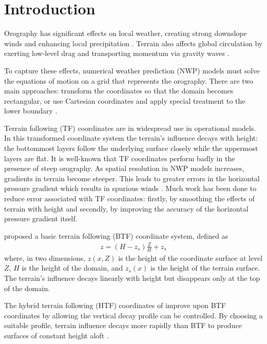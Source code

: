 \chapter{Introduction}

Orography has significant effects on local weather, creating strong downslope winds and enhancing local precipitation \autocite{barry2008}.  Terrain also affects global circulation by exerting low-level drag \autocite{lott-miller1997} and transporting momentum via gravity waves \autocite{mcfarlane1987}.

To capture these effects, numerical weather prediction (NWP) models must solve the equations of motion on a grid that represents the orography.  There are two main approaches: transform the coordinates so that the domain becomes rectangular, or use Cartesian coordinates and apply special treatment to the lower boundary \autocite{galchen-somerville1975}.

Terrain following (TF) coordinates are in widespread use in operational models.  In this transformed coordinate system the terrain's influence decays with height: the bottommost layers follow the underlying surface closely while the uppermost layers are flat.  It is well-known that TF coordinates perform badly in the presence of steep orography.  As spatial resolution in NWP models increases, gradients in terrain become steeper.  This leads to greater errors in the horizontal pressure gradient which results in spurious winds \autocite{dempsey-davis1998}.  Much work has been done to reduce error associated with TF coordinates: firstly, by smoothing the effects of terrain with height and secondly, by improving the accuracy of the horizontal pressure gradient itself.

\cite{galchen-somerville1975} proposed a basic terrain following (BTF) coordinate system, defined as
\begin{align}
z = \left( H - z_s \right) \frac{Z}{H} + z_s
\end{align}
where, in two dimensions, $z(x, Z)$ is the height of the coordinate surface at level $Z$, $H$ is the height of the domain, and $z_s(x)$ is the height of the terrain surface.     The terrain's influence decays linearly with height but disappears only at the top of the domain.

The hybrid terrain following (HTF) coordinates of \cite{simmons-burridge1981} improve upon BTF coordinates by allowing the vertical decay profile can be controlled.  By choosing a suitable profile, terrain influence decays more rapidly than BTF to produce surfaces of constant height aloft \autocite{klemp2011}.

